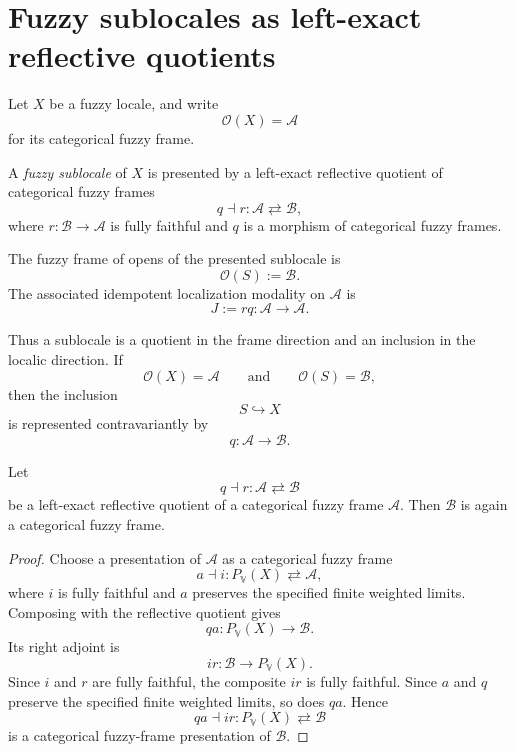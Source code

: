 \section{Fuzzy sublocales as left-exact reflective quotients}
\label{sec:fuzzy-sublocales-as-lex-reflective-quotients}

Let \(X\) be a fuzzy locale, and write
\[
    \mathcal O(X)=\mathcal A
\]
for its categorical fuzzy frame.

\begin{definition}
\label{def:fuzzy-sublocale}
A \emph{fuzzy sublocale} of \(X\) is presented by a left-exact reflective
quotient of categorical fuzzy frames
\[
    q\dashv r:
    \mathcal A
    \rightleftarrows
    \mathcal B,
\]
where \(r:\mathcal B\to\mathcal A\) is fully faithful and \(q\) is a morphism
of categorical fuzzy frames.

The fuzzy frame of opens of the presented sublocale is
\[
    \mathcal O(S):=\mathcal B.
\]
The associated idempotent localization modality on \(\mathcal A\) is
\[
    J:=rq:\mathcal A\to\mathcal A.
\]
\end{definition}

Thus a sublocale is a quotient in the frame direction and an inclusion in the
localic direction.  If
\[
    \mathcal O(X)=\mathcal A
    \qquad\text{and}\qquad
    \mathcal O(S)=\mathcal B,
\]
then the inclusion
\[
    S\hookrightarrow X
\]
is represented contravariantly by
\[
    q:\mathcal A\to\mathcal B.
\]

\begin{proposition}
\label{prop:reflective-quotients-are-fuzzy-frames}
Let
\[
    q\dashv r:
    \mathcal A
    \rightleftarrows
    \mathcal B
\]
be a left-exact reflective quotient of a categorical fuzzy frame
\(\mathcal A\).  Then \(\mathcal B\) is again a categorical fuzzy frame.
\end{proposition}

\begin{proof}
Choose a presentation of \(\mathcal A\) as a categorical fuzzy frame
\[
    a\dashv i:
    P_{\mathbb V}(X)
    \rightleftarrows
    \mathcal A,
\]
where \(i\) is fully faithful and \(a\) preserves the specified finite weighted
limits.  Composing with the reflective quotient gives
\[
    qa:
    P_{\mathbb V}(X)\to\mathcal B.
\]
Its right adjoint is
\[
    ir:\mathcal B\to P_{\mathbb V}(X).
\]
Since \(i\) and \(r\) are fully faithful, the composite \(ir\) is fully
faithful.  Since \(a\) and \(q\) preserve the specified finite weighted limits,
so does \(qa\).  Hence
\[
    qa\dashv ir:
    P_{\mathbb V}(X)
    \rightleftarrows
    \mathcal B
\]
is a categorical fuzzy-frame presentation of \(\mathcal B\).
\end{proof}

